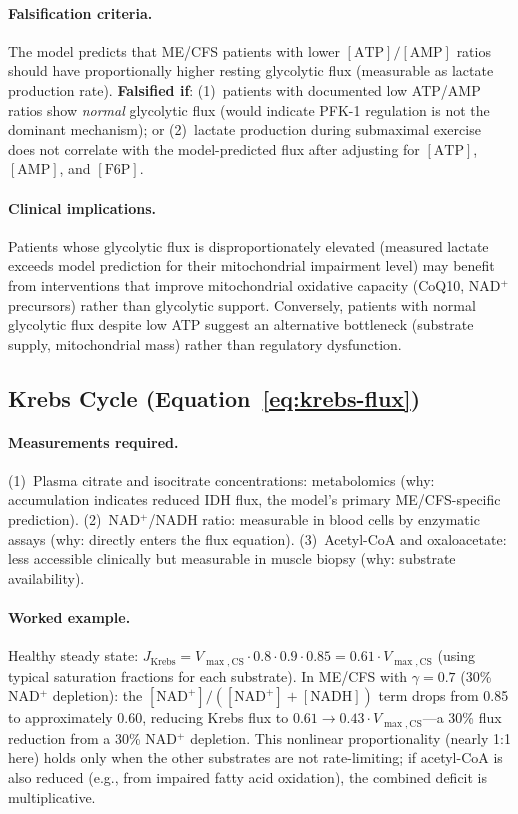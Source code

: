 \paragraph{Falsification criteria.}
The model predicts that ME/CFS patients with lower $[\text{ATP}]/[\text{AMP}]$ ratios should have proportionally higher resting glycolytic flux (measurable as lactate production rate). \textbf{Falsified if}: (1)~patients with documented low ATP/AMP ratios show \emph{normal} glycolytic flux (would indicate PFK-1 regulation is not the dominant mechanism); or (2)~lactate production during submaximal exercise does not correlate with the model-predicted flux after adjusting for $[\text{ATP}]$, $[\text{AMP}]$, and $[\text{F6P}]$.

\paragraph{Clinical implications.}
Patients whose glycolytic flux is disproportionately elevated (measured lactate exceeds model prediction for their mitochondrial impairment level) may benefit from interventions that improve mitochondrial oxidative capacity (CoQ10, NAD$^+$ precursors) rather than glycolytic support. Conversely, patients with normal glycolytic flux despite low ATP suggest an alternative bottleneck (substrate supply, mitochondrial mass) rather than regulatory dysfunction.

\subsection{Krebs Cycle (Equation~\ref{eq:krebs-flux})}

\paragraph{Measurements required.}
(1)~Plasma citrate and isocitrate concentrations: metabolomics (why: accumulation indicates reduced IDH flux, the model's primary ME/CFS-specific prediction).
(2)~NAD$^+$/NADH ratio: measurable in blood cells by enzymatic assays (why: directly enters the flux equation).
(3)~Acetyl-CoA and oxaloacetate: less accessible clinically but measurable in muscle biopsy (why: substrate availability).

\paragraph{Worked example.}
Healthy steady state: $J_{\text{Krebs}} = V_{\max,\text{CS}} \cdot 0.8 \cdot 0.9 \cdot 0.85 = 0.61 \cdot V_{\max,\text{CS}}$ (using typical saturation fractions for each substrate). In ME/CFS with $\gamma = 0.7$ (30\% NAD$^+$ depletion): the $[\text{NAD}^+]/([\text{NAD}^+] + [\text{NADH}])$ term drops from 0.85 to approximately 0.60, reducing Krebs flux to $0.61 \to 0.43 \cdot V_{\max,\text{CS}}$---a 30\% flux reduction from a 30\% NAD$^+$ depletion. This nonlinear proportionality (nearly 1:1 here) holds only when the other substrates are not rate-limiting; if acetyl-CoA is also reduced (e.g., from impaired fatty acid oxidation), the combined deficit is multiplicative.

